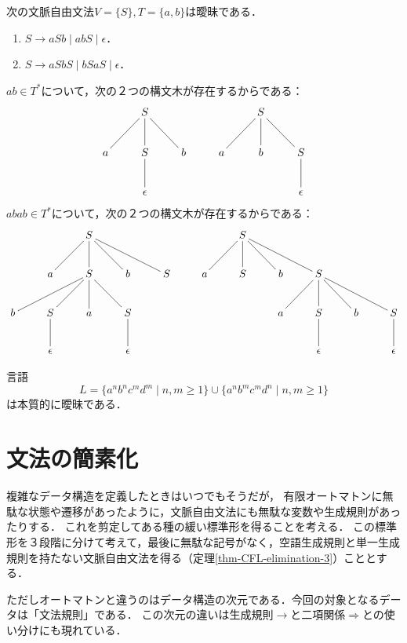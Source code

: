 \documentclass[uplatex, dvipdfmx]{jsreport}
\begin{document}
\begin{example}
    次の文脈自由文法$V=\{S\},T=\{a,b\}$は曖昧である．
    \begin{enumerate}
        \item $S\to aSb\mid abS\mid\epsilon$．
        \item $S\to aSbS\mid bSaS\mid \epsilon$．
    \end{enumerate}
    $ab\in T^*$について，次の２つの構文木が存在するからである：
    \[\xymatrix{
        &S\ar@{-}[d]\ar@{-}[dl]\ar@{-}[dr]&&&S\ar@{-}[d]\ar@{-}[dl]\ar@{-}[dr]\\
        a&S\ar@{-}[d]&b&a&b&S\ar@{-}[d]\\
        &\epsilon&&&&\epsilon
    }\]
    $abab\in T^*$について，次の２つの構文木が存在するからである：
    \[\xymatrix{
        &&S\ar@{-}[dl]\ar@{-}[d]\ar@{-}[dr]\ar@{-}[drr]&&&&S\ar@{-}[dl]\ar@{-}[d]\ar@{-}[dr]\ar@{-}[drr]\\
        &a&S\ar@{-}[dl]\ar@{-}[d]\ar@{-}[dr]\ar@{-}[dll]&b&S&a&S&b&S\ar@{-}[dl]\ar@{-}[d]\ar@{-}[dr]\ar@{-}[drr]\\
        b&S\ar@{-}[d]&a&S\ar@{-}[d]&&&&a&S\ar@{-}[d]&b&S\ar@{-}[d]\\
        &\epsilon&&\epsilon&&&&&\epsilon&&\epsilon
    }\]
\end{example}

\begin{theorem}
    言語
    \[L=\{a^nb^nc^md^m\mid n,m\ge 1\}\cup\{a^nb^mc^md^n\mid n,m\ge 1\}\]
    は本質的に曖昧である．
\end{theorem}

\section{文法の簡素化}

\begin{tcolorbox}[colframe=ForestGreen, colback=ForestGreen!10!white, breakable,
    title=無駄な記号がなく，空語生成規則と単一生成規則を持たない文脈自由文法]
    複雑なデータ構造を定義したときはいつでもそうだが，
    有限オートマトンに無駄な状態や遷移があったように，文脈自由文法にも無駄な変数や生成規則があったりする．
    これを剪定してある種の緩い標準形を得ることを考える．
    この標準形を３段階に分けて考えて，最後に無駄な記号がなく，空語生成規則と単一生成規則を持たない文脈自由文法を得る（定理\ref{thm-CFL-elimination-3}）こととする．

    ただしオートマトンと違うのはデータ構造の次元である．今回の対象となるデータは「文法規則」である．
    この次元の違いは生成規則$\to$と二項関係$\Rightarrow$との使い分けにも現れている．
\end{tcolorbox}
\end{document}
